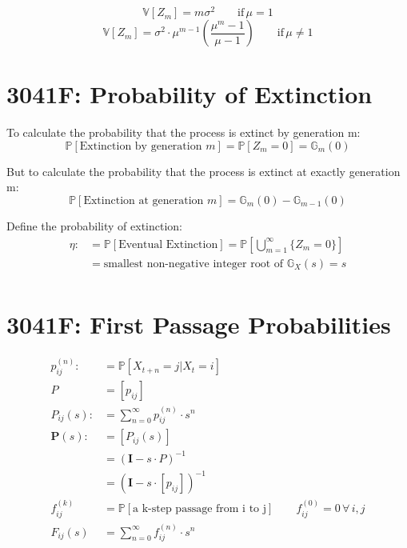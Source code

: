 \documentclass[12pt]{article}
\begin{document}
    \begin{equation*}
        \mathbb{V}[Z_m] = m\sigma^2 \qquad \text{if} \, \mu = 1
    \end{equation*}
    \begin{equation*}
        \mathbb{V}[Z_m] = \sigma^2 \cdot \mu^{m-1} \left( \frac{\mu^{m} - 1}{\mu - 1} \right) \qquad \text{if}\, \mu \ne 1
    \end{equation*}
\section{3041F: Probability of Extinction}
    To calculate the probability that the process is extinct by generation m:
    \begin{equation*}
        \mathbb{P}[\text{Extinction by generation } m] = \mathbb{P}[Z_m = 0] = \mathbb{G}_m(0)
    \end{equation*}

    But to calculate the probability that the process is extinct at exactly generation m:
    \begin{equation*}
        \mathbb{P}[\text{Extinction at generation } m] = \mathbb{G}_m(0) - \mathbb{G}_{m-1}(0)
    \end{equation*}

    Define the probability of extinction:
    \begin{equation*}
        \begin{aligned}
            \eta :&= \mathbb{P}[\text{Eventual Extinction}] = \mathbb{P}\left[\bigcup_{m=1}^{\infty} \{ Z_m = 0 \}\right] \\
            &= \text{smallest non-negative integer root of } \mathbb{G}_X(s) = s \\
        \end{aligned}
    \end{equation*}
\section{3041F: First Passage Probabilities}
    \begin{equation*}
        \begin{aligned}
            p_{ij}^{(n)} :&= \mathbb{P}[X_{t+n} = j | X_{t} = i]  \\
            P &= \left[ p_{ij}\right]\\
            P_{ij}(s) :&= \sum_{n=0}^{\infty} p_{ij}^{(n)} \cdot s^n \\
            \mathbf{P}(s) :&= \left[ P_{ij}(s) \right]\\
            &= \left( \mathbf{I} - s \cdot P \right)^{-1}\\
            &= \left( \mathbf{I} - s \cdot \left[ p_{ij}\right] \right)^{-1}\\
            f_{ij}^{(k)} &= \mathbb{P}[\text{a k-step passage from i to j}] \qquad f_{ij}^{(0)} = 0 \,\forall\, i, j \\
            F_{ij}(s) &= \sum_{n=0}^{\infty} f_{ij}^{(n)} \cdot s^n \\
        \end{aligned}
    \end{equation*}
\end{document}
